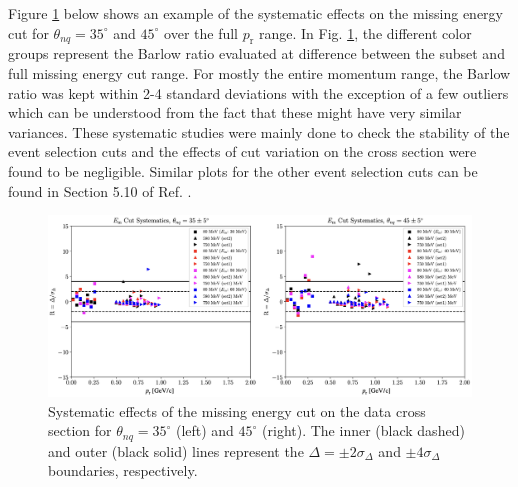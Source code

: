 \documentclass[aps, prl]{revtex4-2}  %
\begin{document}
\indent Figure \ref{fig:fig11} below shows an example of the systematic effects on the missing energy cut for $\theta_{nq}=35^{\circ}$ and $45^{\circ}$ over the full $p_{\mathrm{r}}$ range.
In Fig. \ref{fig:fig11}, the different color groups represent the Barlow ratio evaluated at difference between the subset and full missing energy cut range. For mostly the entire momentum range,
the Barlow ratio was kept within 2-4 standard deviations with the exception of a few outliers which can be understood from the fact that these might have very similar variances. These systematic
studies were mainly done to check the stability of the event selection cuts and the effects of cut variation on the cross section were found to be negligible. Similar plots for the other event selection
cuts can be found in Section 5.10 of Ref. \cite{cyero_phdthesis}. 
\clearpage
\begin{figure}[!ht]
\includegraphics[scale=0.45]{plots/Em_syst.png}
\caption{Systematic effects of the missing energy cut on the data cross section for $\theta_{nq}=35^{\circ}$ (left) and $45^{\circ}$ (right). The inner (black dashed) and outer (black solid)
  lines represent the $\Delta=\pm2\sigma_{\Delta}$ and $\pm4\sigma_{\Delta}$ boundaries, respectively.}
\label{fig:fig11}
\end{figure}
\end{document}
